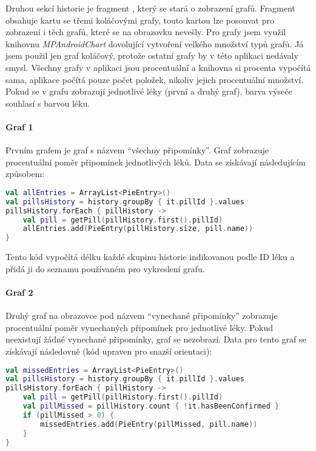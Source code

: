 \documentclass[../TakeYourPill.tex]{subfiles}
\begin{document}
Druhou sekcí historie je fragment , který se stará o zobrazení grafů. Fragment obsahuje kartu se třemi koláčovými grafy, touto kartou lze posouvat pro zobrazení i těch grafů, které se na obrazovku nevešly. Pro grafy jsem využil knihovnu \textit{MPAndroidChart} \cite{chart} dovolující vytvoření velkého množství typů grafů. Já jsem použil jen graf koláčový, protože ostatní grafy by v této aplikaci nedávaly smysl. Všechny grafy v aplikaci jsou procentuální a knihovna si procenta vypočítá sama, aplikace počítá pouze počet položek, nikoliv jejich procentuální množství. Pokud se v grafu zobrazují jednotlivé léky (první a druhý graf), barva výseče souhlasí s barvou léku. 

\paragraph{Graf 1} Prvním grafem je graf s názvem \enquote{všechny připomínky}. Graf zobrazuje procentuální poměr připomínek jednotlivých léků. Data se získávají následujícím způsobem:

\begin{lstlisting}[language=Kotlin]
val allEntries = ArrayList<PieEntry>()
val pillsHistory = history.groupBy { it.pillId }.values
pillsHistory.forEach { pillHistory ->
    val pill = getPill(pillHistory.first().pillId)
    allEntries.add(PieEntry(pillHistory.size, pill.name))
}
\end{lstlisting}

Tento kód vypočítá délku každé skupinu historie indikovanou podle ID léku a přidá ji do seznamu používaném pro vykreslení grafu.


\paragraph{Graf 2} Druhý graf na obrazovce pod názvem \enquote{vynechané připomínky} zobrazuje procentuální poměr vynechaných připomínek pro jednotlivé léky. Pokud neexistují žádné vynechané připomínky, graf se nezobrazí. Data pro tento graf se získávají následovně (kód upraven pro snazší orientaci):

\begin{lstlisting}[language=Kotlin]
val missedEntries = ArrayList<PieEntry>()
val pillsHistory = history.groupBy { it.pillId }.values
pillsHistory.forEach { pillHistory ->
    val pill = getPill(pillHistory.first().pillId)
    val pillMissed = pillHistory.count { !it.hasBeenConfirmed }
    if (pillMissed > 0) {
        missedEntries.add(PieEntry(pillMissed, pill.name))
    }
}
\end{lstlisting}
\end{document}
